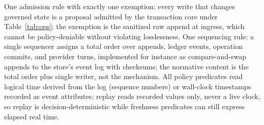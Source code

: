 \documentclass[11pt]{article}
\begin{document}
One admission rule with exactly one exemption: every write that changes governed state is a proposal admitted by the transaction core under Table~\ref{tab:ops}; the exemption is the sanitized raw append at ingress, which cannot be policy-deniable without violating losslessness. One sequencing rule: a single sequencer assigns a total order over appends, ledger events, operation commits, and provider turns, implemented for instance as compare-and-swap appends to the store's event log with checksums; the normative content is the total order plus single writer, not the mechanism. All policy predicates read logical time derived from the log (sequence numbers) or wall-clock timestamps recorded as event attributes; replay reads recorded values only, never a live clock, so replay is decision-deterministic while freshness predicates can still express elapsed real time.
\end{document}
